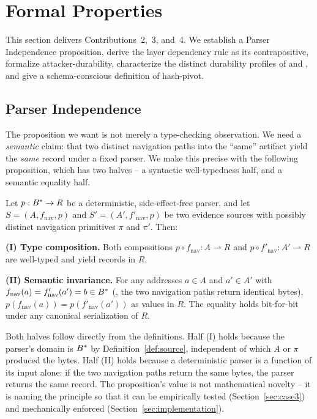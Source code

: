 \section{Formal Properties}
\label{sec:properties}

This section delivers Contributions~2,~3, and~4. We establish a Parser
Independence proposition, derive the layer dependency rule as its
contrapositive, formalize attacker-durability, characterize the distinct
durability profiles of  and , and give a schema-conscious
definition of hash-pivot.


\subsection{Parser Independence}

The proposition we want is not merely a type-checking observation. We need a
\emph{semantic} claim: that two distinct navigation paths into the
``same'' artifact yield the \emph{same} record under a fixed parser. We
make this precise with the following proposition, which has two halves -- a
syntactic well-typedness half, and a semantic equality half.

\begin{proposition}
\label{thm:parser-indep}
Let $p : B^{*} \to R$ be a deterministic, side-effect-free parser, and let
$S = (A, f_{\mathrm{nav}}, p)$ and $S' = (A', f'_{\mathrm{nav}}, p)$ be two
evidence sources with possibly distinct navigation primitives $\pi$ and
$\pi'$. Then:

\smallskip
\noindent\textbf{(I) Type composition.}
Both compositions $p \circ f_{\mathrm{nav}}: A \rightharpoonup R$ and $p
\circ f'_{\mathrm{nav}}: A' \rightharpoonup R$ are well-typed and yield
records in $R$.

\smallskip
\noindent\textbf{(II) Semantic invariance.}
For any addresses $a \in A$ and $a' \in A'$ with $f_{\mathrm{nav}}(a) =
f'_{\mathrm{nav}}(a') = b \in B^{*}$ (\ie{}, the two navigation paths
return identical bytes), $p(f_{\mathrm{nav}}(a)) = p(f'_{\mathrm{nav}}(a'))$
as values in $R$. The equality holds bit-for-bit under any canonical
serialization of $R$.
\end{proposition}

Both halves follow directly from the definitions. Half (I) holds because the
parser's domain is $B^{*}$ by Definition~\ref{def:source}, independent of
which $A$ or $\pi$ produced the bytes. Half (II) holds because a
deterministic parser is a function of its input alone: if the two navigation
paths return the same bytes, the parser returns the same record. The
proposition's value is not mathematical novelty -- it is naming the principle
so that it can be empirically tested (Section~\ref{sec:case3}) and
mechanically enforced (Section~\ref{sec:implementation}).

